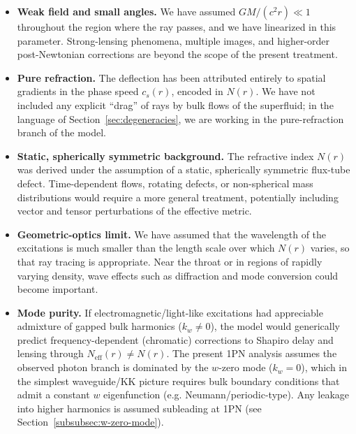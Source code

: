 \documentclass[11pt]{article}
\begin{document}
\begin{itemize}
  \item \textbf{Weak field and small angles.}
        We have assumed $GM/(c^2 r) \ll 1$ throughout the region where the
        ray passes, and we have linearized in this parameter.
        Strong-lensing phenomena, multiple images, and higher-order
        post-Newtonian corrections are beyond the scope of the present
        treatment.

  \item \textbf{Pure refraction.}
        The deflection has been attributed entirely to spatial gradients in
        the phase speed $c_s(r)$, encoded in $N(r)$.
        We have not included any explicit ``drag'' of rays by bulk flows of
        the superfluid; in the language of Section~\ref{sec:degeneracies},
        we are working in the pure-refraction branch of the model.

  \item \textbf{Static, spherically symmetric background.}
        The refractive index $N(r)$ was derived under the assumption of a
        static, spherically symmetric flux-tube defect.
        Time-dependent flows, rotating defects, or non-spherical mass
        distributions would require a more general treatment, potentially
        including vector and tensor perturbations of the effective metric.

  \item \textbf{Geometric-optics limit.}
        We have assumed that the wavelength of the excitations is much
        smaller than the length scale over which $N(r)$ varies, so that ray
        tracing is appropriate.
        Near the throat or in regions of rapidly varying density, wave
        effects such as diffraction and mode conversion could become
        important.

  \item \textbf{Mode purity.}
        If electromagnetic/light-like excitations had appreciable admixture of gapped bulk
        harmonics ($k_w\neq 0$), the model would generically predict
        frequency-dependent (chromatic) corrections to Shapiro delay and
        lensing through $N_{\mathrm{eff}}(r)\neq N(r)$.
        The present 1PN analysis assumes the observed photon branch is
        dominated by the $w$-zero mode ($k_w=0$), which in the simplest
        waveguide/KK picture requires bulk boundary conditions that admit a
        constant $w$ eigenfunction (e.g. Neumann/periodic-type).
        Any leakage into higher harmonics is assumed subleading at 1PN
        (see Section~\ref{subsubsec:w-zero-mode}).
\end{itemize}
\end{document}
